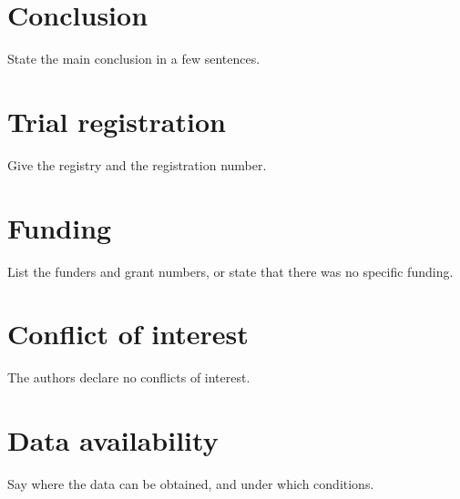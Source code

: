 \documentclass[unnumsec,webpdf,contemporary,large]{oup-authoring-template}
\begin{document}
\section{Conclusion}
State the main conclusion in a few sentences.

\section{Trial registration}
Give the registry and the registration number.

\section{Funding}
List the funders and grant numbers, or state that there was no specific funding.

\section{Conflict of interest}
The authors declare no conflicts of interest.

\section{Data availability}
Say where the data can be obtained, and under which conditions.



\end{document}
